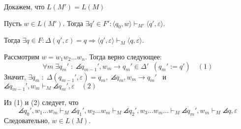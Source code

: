 Докажем, что $L(M') = L(M)$

Пусть $w\in L(M')$. Тогда $\exists q' \in F' : \langle q_0, w \rangle \vdash_{M'} \langle q', \varepsilon \rangle$. 

Тогда $\exists q \in F : \Delta(q',\varepsilon) = q \Longrightarrow \langle q', \varepsilon \rangle \vdash_{M} \langle q, \varepsilon \rangle$.

Рассмотрим $w = w_1 w_2 \dots w_n$. Тогда верно следующее:
$$
\forall m \; \exists q_m' \; : \; \angles{q_{m-1}', w_m} \rightarrow q_m' \in \Delta' \;\; (q_m' := q') \quad (1)
$$
Значит, $\exists q_{m} \; : \; \Delta(q_{m-1}', \varepsilon) = q_{m}, \; \angles{q_{m}, w_m} \rightarrow q_m'$ \ и \ $\angles{q_{m-1}', w_{m}}\vdash_M \angles{q_m', \varepsilon} \quad (2)$

Из (1) и (2) следует, что 
$$
\angles{q_0', w_1\ldots w_m}\vdash_M\angles{q_1', w_2\ldots w_m}\vdash_M\angles{q_2', w_3\ldots w_m}\ldots\vdash_M\angles{q_m', w_m}\vdash_M\angles{q, \varepsilon}
$$
Следовательно, $w\in L(M)$.



    
    
    
    
    
